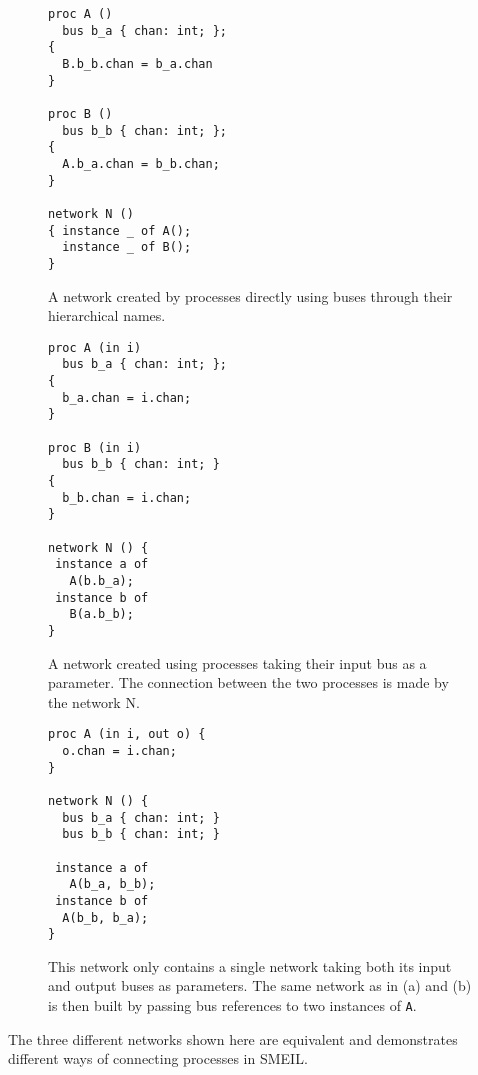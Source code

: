 \begin{widefigure}
  \begin{subfigure}[t]{0.32\textwidth}
    \begin{lstlisting}[language=smeil]
proc A ()
  bus b_a { chan: int; };
{
  B.b_b.chan = b_a.chan
}

proc B ()
  bus b_b { chan: int; };
{ 
  A.b_a.chan = b_b.chan;
}

network N ()
{ instance _ of A();
  instance _ of B();
}
\end{lstlisting}
    \caption{A network created by processes directly using buses through their
      hierarchical names.}
  \label{fig:directpublic}
\end{subfigure}\hfill
  \begin{subfigure}[t]{0.32\textwidth}
    \begin{lstlisting}[language=smeil]
proc A (in i)
  bus b_a { chan: int; };
{
  b_a.chan = i.chan;
}

proc B (in i)
  bus b_b { chan: int; }
{
  b_b.chan = i.chan;
}

network N () {
 instance a of
   A(b.b_a);
 instance b of
   B(a.b_b);
}
\end{lstlisting}
    \caption{A network created using processes taking their input bus as a
      parameter. The connection between the two processes is made by the network
      N.}
  \end{subfigure}\hfill
  \begin{subfigure}[t]{0.32\textwidth}
    \begin{lstlisting}[language=smeil]
proc A (in i, out o) {
  o.chan = i.chan;
}

network N () {
  bus b_a { chan: int; }
  bus b_b { chan: int; }

 instance a of
   A(b_a, b_b);
 instance b of
  A(b_b, b_a);
}
\end{lstlisting}
    \caption{This network only contains a single network taking both its input
      and output buses as parameters. The same network as in (a) and (b) is then
      built by passing bus references to two instances of {\tt A}.}
    
  \end{subfigure}

  \caption{The three different networks shown here are equivalent and
    demonstrates different ways of connecting processes in SMEIL.}
  \label{fig:comms}
\end{widefigure}

